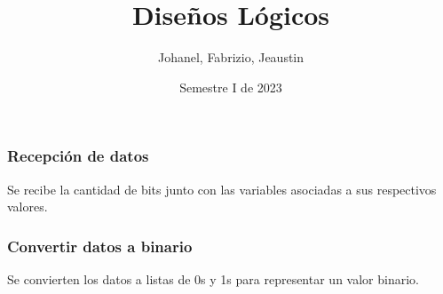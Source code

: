 \documentclass{beamer}
\title{Diseños Lógicos}
\author{Johanel, Fabrizio, Jeaustin}
\institute{Tecnológico de Costa Rica}
\date{Semestre I de 2023}
\begin{document}
\begin{frame}
\frametitle{Recepción de datos}
Se recibe la cantidad de bits junto con las variables asociadas a sus respectivos valores.
\end{frame}
\begin{frame}
\frametitle{Convertir datos a binario}
Se convierten los datos a listas de 0s y 1s para representar un valor binario.
\end{frame}

\begin{frame}
\maketitle
{}
\end{frame}
\end{document}
